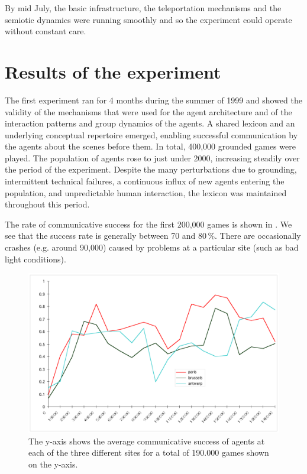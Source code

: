 By mid July, the basic infrastructure, the teleportation mechanisms and the semiotic dynamics were running 
smoothly and so the experiment could operate without constant care. 

\section{Results of the experiment}

The first  experiment ran for 4 months during the summer of 1999 and showed the validity of the mechanisms that were used for the agent architecture and of the interaction patterns and group dynamics of the agents. A shared lexicon and an underlying conceptual repertoire emerged, enabling successful communication by the agents about the scenes before them. In total, 400,000 grounded games were played. The population of agents rose to just under 2000, increasing steadily over the period of the experiment. Despite the many perturbations due to grounding, intermittent technical failures, a continuous influx of new agents entering the population, and unpredictable human interaction, the lexicon was maintained throughout this period.

The rate of communicative success for the first 200,000 games is shown in . We see that the success rate is generally between 70 and 80\,\%. There are occasionally crashes (e.g. around 90,000) caused by problems at a particular site (such as bad light conditions). 


\begin{figure}[htbp]
  \centerline{\includegraphics[width=\textwidth]{chap8/figures/allsites.pdf}}
\caption{\label{fig:allsites}The y-axis shows the average communicative success of agents at each of the three different sites for a total 
of 190.000 games shown on the y-axis. 
}
\end{figure}

